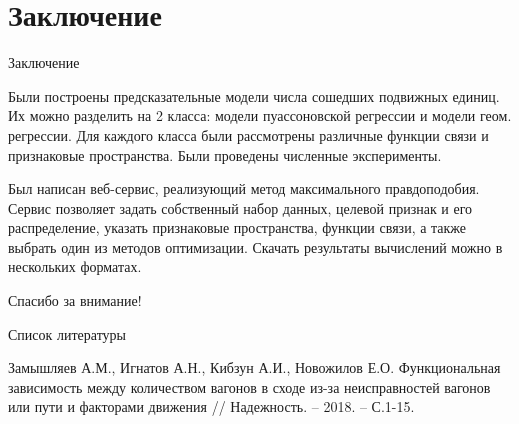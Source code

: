 \documentclass[aspectratio=169]{beamer}
\begin{document}
    \section{Заключение}
    \begin{frame}{Заключение}
        \begin{block}{}
            Были построены предсказательные модели числа сошедших подвижных единиц. Их можно разделить на 2 класса: модели пуассоновской регрессии и модели геом. регрессии. Для каждого класса были рассмотрены различные функции связи и признаковые пространства. Были проведены численные эксперименты.
        \end{block}
    
        \begin{block}{}
            Был написан веб-сервис, реализующий метод максимального правдоподобия. Сервис позволяет задать собственный набор данных, целевой признак и его распределение, указать признаковые пространства, функции связи, а также выбрать один из методов оптимизации. Скачать результаты вычислений можно в нескольких форматах.
        \end{block}
    \end{frame}
    
    \begin{frame}{}
        \centering
        \Huge
        Спасибо за внимание!
    \end{frame}

    \begin{frame}{Список литературы}
        \begin{thebibliography}{00}
             Замышляев А.М., Игнатов А.Н., Кибзун А.И., Новожилов Е.О. Функциональная зависимость между количеством вагонов в сходе из-за неисправностей вагонов или пути и факторами движения // Надежность. -- 2018. -- С.1-15.
        \end{thebibliography}
    \end{frame}
\end{document}
